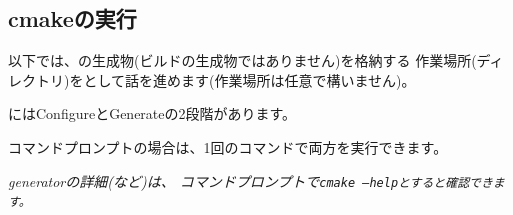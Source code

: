 \subsection{cmakeの実行}
\label{subsec:CmakeLibrary}

\noindent
以下では、\cmake の生成物(ビルドの生成物ではありません)を格納する
作業場所(ディレクトリ)を\build として話を進めます(作業場所は任意で構いません)。

\medskip
\noindent
\cmake にはConfigureとGenerateの2段階があります。

\medskip
\noindent
コマンドプロンプトの場合は、1回のコマンドで両方を実行できます。
\begin{narrow}[15pt]
	\it{generatorの}詳細(など)は、
	コマンドプロンプトで\tt{cmake --help}とすると確認できます。
\end{narrow}

